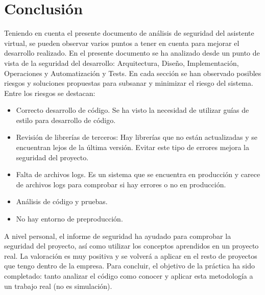 \chapter{Conclusión}
\label{chap:conclusion}

Teniendo en cuenta el presente documento de análisis de seguridad del asistente virtual, se pueden observar varios puntos a tener en cuenta para mejorar el desarrollo realizado. En el presente documento se ha analizado desde un punto de vista de la seguridad del desarrollo: Arquitectura, Diseño, Implementación, Operaciones y Automatización y Tests.
En cada sección se han observado posibles riesgos y soluciones propuestas para subsanar y minimizar el riesgo del sistema. Entre los riesgos se destacan:

\begin{itemize}
    \item Correcto desarrollo de código. Se ha visto la necesidad de utilizar guías de estilo para desarrollo de código.
    \item Revisión de librerías de terceros: Hay librerías que no están actualizadas y se encuentran lejos de la última versión. Evitar este tipo de errores mejora la seguridad del proyecto.
    \item Falta de archivos logs. Es un sistema que se encuentra en producción y carece de archivos logs para comprobar si hay errores o no en producción.
    \item Análisis de código y pruebas.
    \item No hay entorno de preproducción. 
    
\end{itemize}

A nivel personal, el informe de seguridad ha ayudado para comprobar la seguridad del proyecto, así como utilizar los conceptos aprendidos en un proyecto real. La valoración es muy positiva y se volverá a aplicar en el resto de proyectos que tengo dentro de la empresa. Para concluir, el objetivo de la práctica ha sido completado: tanto analizar el código como conocer y aplicar esta metodología a un trabajo real (no es simulación).